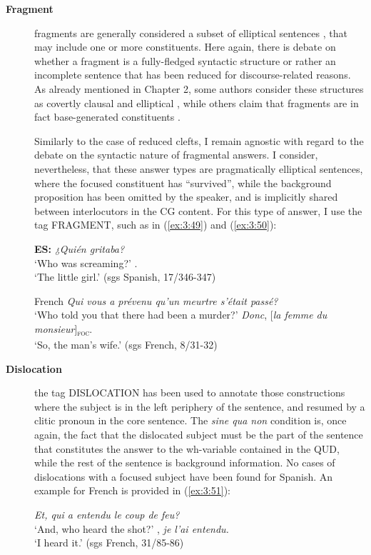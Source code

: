 \begin{description}
\item[\textbf{Fragment}] fragments are generally considered a subset of elliptical sentences \parencite{merchant2005fragments}, that may include one or more constituents. Here again, there is debate on whether a fragment is a fully-fledged syntactic structure or rather an incomplete sentence that has been reduced for discourse-related reasons. As already mentioned in Chapter 2,
some authors consider these structures as covertly clausal and elliptical \parencite{merchant2005fragments}, while others claim that fragments are in fact base-generated constituents \parencite{stainton1998quantifier, jonathan2000interrogative, jacobson2016short}. 

Similarly to the case of reduced clefts, I remain agnostic with regard to the debate on the syntactic nature of fragmental answers. I consider, nevertheless, that these answer types are pragmatically elliptical sentences, where the focused constituent has ``survived”, while the background proposition has been omitted by the speaker, and is implicitly shared between interlocutors in the CG content. For this type of answer, I use the tag {\selectfont FRAGMENT}, such as in (\ref{ex:3:49}) and (\ref{ex:3:50}):  

\ea \label{ex:3:49} \textbf{ES:}
\ea \textit{¿Quién gritaba?} \\
 ‘Who was screaming?'
\normalsize. \\
‘The little girl.' \hfill (sgs Spanish, 17/346-347)   
\z \z

 \ea \label{ex:3:50} French
\ea 	\textit{Qui vous a prévenu qu'un meurtre s'était passé?} \\
 ‘Who told you that there had been a murder?'
\ex   \textit{Donc}, {[\textit{la femme du monsieur}]\textsubscript{\textsc{foc}}}\normalsize. \\
‘So, the man's wife.' \hfill (sgs French, 8/31-32)   
\z \z 

\item[\textbf{Dislocation}] the tag {\selectfont DISLOCATION} has been used to annotate those constructions where the subject is in the left periphery of the sentence, and resumed by a clitic pronoun in the core sentence. The \textit{sine qua non} condition is, once again, the fact that the dislocated subject must be the part of the sentence that constitutes the answer to the wh-variable contained in the QUD, while the rest of the sentence is background information. No cases of dislocations with a focused subject have been found for Spanish. An example for French is provided in (\ref{ex:3:51}):

 \ea \label{ex:3:51}
\ea  \textit{Et, qui a entendu le coup de feu?} \\
 ‘And, who heard the shot?'
\normalsize, \textit{je l'ai entendu.} \\
‘I heard it.' \hfill (sgs French, 31/85-86)    
\z \z  

\end{description}

